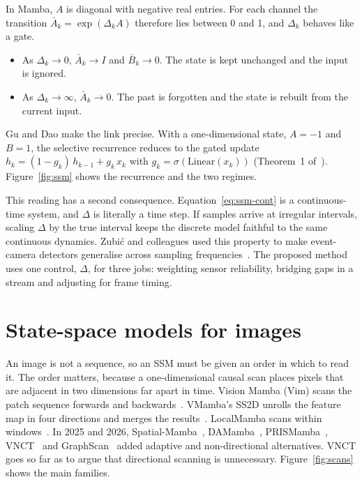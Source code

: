 In Mamba, $A$ is diagonal with negative real entries. For each channel the
transition $\bar A_k = \exp(\Delta_k A)$ therefore lies between 0 and 1, and
$\Delta_k$ behaves like a gate.
\begin{itemize}
  \item As $\Delta_k \to 0$, $\bar A_k \to I$ and $\bar B_k \to 0$. The state
        is kept unchanged and the input is ignored.
  \item As $\Delta_k \to \infty$, $\bar A_k \to 0$. The past is forgotten and
        the state is rebuilt from the current input.
\end{itemize}
Gu and Dao make the link precise. With a one-dimensional state, $A=-1$ and
$B=1$, the selective recurrence reduces to the gated update
$h_k = (1-g_k)\,h_{k-1} + g_k\,x_k$ with $g_k=\sigma(\text{Linear}(x_k))$
(Theorem~1 of~\citep{gu2023mamba}). Figure~\ref{fig:ssm} shows the recurrence
and the two regimes.

This reading has a second consequence. Equation~\eqref{eq:ssm-cont} is a
continuous-time system, and $\Delta$ is literally a time step. If samples
arrive at irregular intervals, scaling $\Delta$ by the true interval keeps
the discrete model faithful to the same continuous dynamics. Zubi\'c and
colleagues used this property to make event-camera detectors generalise
across sampling frequencies~\citep{zubic2024ssmevent}. The proposed method
uses one control, $\Delta$, for three jobs: weighting sensor reliability,
bridging gaps in a stream and adjusting for frame timing.



\section{State-space models for images}
\label{sec:vssm}

An image is not a sequence, so an SSM must be given an order in which to
read it. The order matters, because a one-dimensional causal scan places
pixels that are adjacent in two dimensions far apart in time. Vision Mamba
(Vim) scans the patch sequence forwards and backwards~\citep{zhu2024vim}.
VMamba's SS2D unrolls the feature map in four directions and merges the
results~\citep{liu2024vmamba}. LocalMamba scans within windows~\citep{huang2024localmamba}.
In 2025 and 2026, Spatial-Mamba~\citep{xiao2025spatialmamba},
DAMamba~\citep{damamba2025}, PRISMamba~\citep{prismamba2026}, VNCT~\citep{vnct2026}
and GraphScan~\citep{graphscan2026} added adaptive and non-directional
alternatives. VNCT goes so far as to argue that directional scanning is
unnecessary. Figure~\ref{fig:scans} shows the main families.

